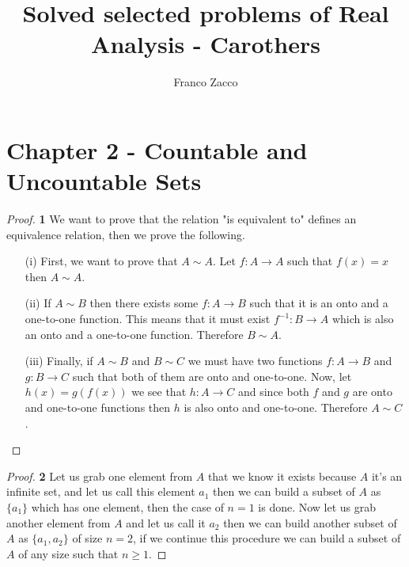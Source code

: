 \documentclass[11pt]{article}
\title{\textbf{Solved selected problems of Real Analysis - Carothers}}
\author{Franco Zacco}
\date{}
\theoremstyle{definition}
\begin{document}
\maketitle
\thispagestyle{empty}

\section*{Chapter 2 - Countable and Uncountable Sets}

	\begin{proof}{\textbf{1}}
        We want to prove that the relation "is equivalent to" defines an equivalence
        relation, then we prove the following.
        \begin{itemize}
        \item [(i)] First, we want to prove that $A \sim A$. Let $f:A\rightarrow A$ such
        that $f(x) = x$ then $A \sim A$.
        \item[(ii)] If $A \sim B$ then there exists some $f:A \rightarrow B$ such that
        it is an onto and a one-to-one function. This means that it must exist
        $f^{-1}:B \rightarrow A$ which is also an onto and a one-to-one function.
        Therefore $B \sim A$.
        \item[(iii)] Finally, if $A\sim B$ and $B \sim C$ we must have two functions
        $f:A\rightarrow B$ and $g: B \rightarrow C$ such that both of them are onto and
        one-to-one. Now, let $h(x) = g(f(x))$ we see that $h:A \rightarrow C$ and since
        both $f$ and $g$ are onto and one-to-one functions then $h$ is also onto and
        one-to-one. Therefore $A \sim C$.
        \end{itemize}
    \end{proof}
	\begin{proof}{\textbf{2}}
        Let us grab one element from $A$ that we know it exists because $A$ it's an
        infinite set, and let us call this element $a_1$ then we can build a subset
        of $A$ as $\{a_1\}$ which has one element, then the case of $n=1$ is done.
        Now let us grab another element from $A$ and let us call it $a_2$ then we can
        build another subset of $A$ as $\{a_1, a_2\}$ of size $n=2$, if we continue
        this procedure we can build a subset of $A$ of any size such that $n \geq 1$. 
    \end{proof}
\cleardoublepage
\end{document}
